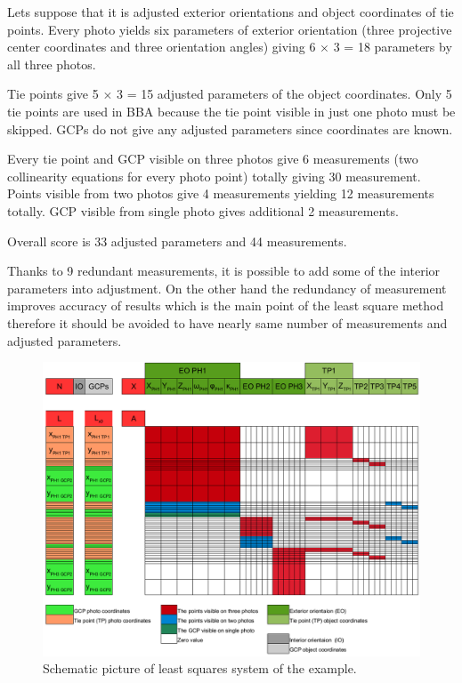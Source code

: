 \documentclass[a4paper,12pt]{article}
\begin{document}
Lets suppose that it is adjusted exterior orientations and object coordinates of tie points.  
Every photo yields six parameters of exterior orientation (three projective center coordinates and three orientation angles) 
 giving 6 $\times$ 3 = 18 parameters by all three photos. 

Tie points give 5 $\times$ 3 = 15 adjusted parameters of the object coordinates. 
Only 5 tie points are used in BBA because the tie point visible in just one photo must be skipped.
GCPs do not give any adjusted parameters since coordinates are known.

Every tie point and GCP visible on three photos give 6 measurements (two collinearity equations for every photo point)
totally giving 30 measurement.
Points visible from two photos give 4 measurements yielding 12 measurements totally.
GCP visible from single photo gives additional 2 measurements.

Overall score is 33 adjusted parameters and 44 measurements.

Thanks to 9 redundant measurements, it is possible to add some of the interior parameters into adjustment.  
On the other hand the redundancy of measurement improves accuracy of results which is the main point of the least square method
therefore it should be avoided to have nearly same number of measurements and adjusted parameters.



\begin{figure}[!h]
   \includegraphics[scale=0.47,  angle=90]{figures/bba_system.png}
    \caption{Schematic picture of least squares system of the example.}
    \label{fig:bba_system}
\end{figure}
\end{document}

